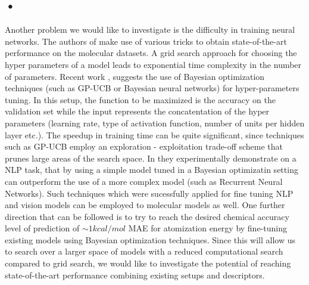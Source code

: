 \documentclass[10pt,journal,a4paper]{IEEEtran}
\begin{document}
\subsection*{•}
Another problem we would like to investigate is the difficulty in training neural networks. The authors of \cite{montavon2012learning} make use of various tricks \cite{tricks} to obtain state-of-the-art performance on the molecular datasets. A grid search approach for choosing the hyper parameters of a model leads to exponential time complexity in the number of parameters.
Recent work \cite{hyperparameter}, \cite{citeulike} suggests the use of Bayesian optimization techniques (such as GP-UCB or Bayesian neural networks) for hyper-parameters tuning. In this setup, the function to be maximized is the accuracy on the validation set while the input represents the concatentation of the hyper parameters (learning rate, type of activation function, number of units per hidden layer etc.). The speedup in training time can be quite significant, since techniques such as GP-UCB employ an exploration - exploitation trade-off scheme that prunes large areas of the search space.
In \cite{citeulike} they experimentally demonstrate on a NLP task, that by using a simple model tuned in a Bayesian optimizatin setting can outperform the use of a more complex model (such as Recurrent Neural Networks).
Such techniques which were sucessfully applied for fine tuning NLP and vision models can be employed to molecular models as well.
One further direction that can be followed is to try to reach the desired chemical accuracy level of prediction of $\sim 1kcal/mol$ MAE for atomization energy by fine-tuning existing models using Bayesian optimization techniques. 
Since this will allow us to search over a larger space of models with a reduced computational search compared to grid search, we would like to investigate the potential of reaching state-of-the-art performance combining existing setups and descriptors.


\vspace{1cm}
\end{document}
